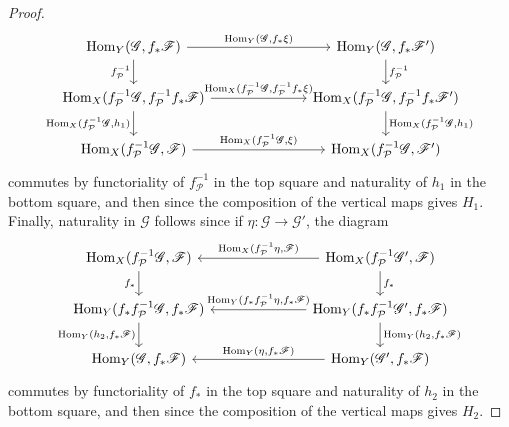\documentclass[10pt]{article}
\theoremstyle{definition}
\theoremstyle{remark}
\numberwithin{equation}{section}
\numberwithin{figure}{subsubsection}
\DeclareMathOperator{\Hom}{Hom}
\begin{document}
\begin{proof}
\begin{equation*}
\begin{tikzcd}[column sep=16ex]
      \Hom_Y(\mathscr{G},f_*\mathscr{F}) \rar{\Hom_Y(\mathscr{G},f_*\xi)}\dar[swap]{f_\mathcal{P}^{-1}} & \Hom_Y(\mathscr{G},f_*\mathscr{F}')\dar{f_\mathcal{P}^{-1}}\\
      \Hom_X(f_\mathcal{P}^{-1}\mathscr{G},f_\mathcal{P}^{-1}f_*\mathscr{F}) \rar{\Hom_X(f_\mathcal{P}^{-1}\mathscr{G},f_\mathcal{P}^{-1}f_*\xi)} \dar[swap]{\Hom_X(f_\mathcal{P}^{-1}\mathscr{G},h_1)} & \Hom_X(f_\mathcal{P}^{-1}\mathscr{G},f_\mathcal{P}^{-1}f_*\mathscr{F}')\dar{\Hom_X(f_\mathcal{P}^{-1}\mathscr{G},h_1)}\\
      \Hom_X(f_\mathcal{P}^{-1}\mathscr{G},\mathscr{F}) \rar{\Hom_X(f_\mathcal{P}^{-1}\mathscr{G},\xi)} & \Hom_X(f_\mathcal{P}^{-1}\mathscr{G},\mathscr{F}')
    \end{tikzcd}
  \end{equation*}
  commutes by functoriality of $f_\mathcal{P}^{-1}$ in the top square and naturality of $h_1$ in the bottom square, and then since the composition of the vertical maps gives $H_1$. Finally, naturality in $\mathscr{G}$ follows since if $\eta\colon\mathscr{G} \to \mathscr{G}'$, the diagram
  \begin{equation*}
    \begin{tikzcd}[column sep=16ex]
      \Hom_X(f^{-1}_\mathcal{P}\mathscr{G},\mathscr{F})\dar[swap]{f_*} & \Hom_X(f^{-1}_\mathcal{P}\mathscr{G}',\mathscr{F}) \arrow{l}[swap]{\Hom_X(f_\mathcal{P}^{-1}\eta,\mathscr{F})}\dar{f_*}\\
      \Hom_Y(f_*f^{-1}_\mathcal{P}\mathscr{G},f_*\mathscr{F})\dar[swap]{\Hom_Y(h_2,f_*\mathscr{F})} & \Hom_Y(f_*f^{-1}_\mathcal{P}\mathscr{G}',f_*\mathscr{F}) \arrow{l}[swap]{\Hom_Y(f_*f_\mathcal{P}^{-1}\eta,f_*\mathscr{F})}\dar{\Hom_Y(h_2,f_*\mathscr{F})}\\
      \Hom_Y(\mathscr{G},f_*\mathscr{F}) & \Hom_Y(\mathscr{G}',f_*\mathscr{F}) \arrow{l}[swap]{\Hom_Y(\eta,f_*\mathscr{F})}
    \end{tikzcd}
  \end{equation*}
  commutes by functoriality of $f_*$ in the top square and naturality of $h_2$ in the bottom square, and then since the composition of the vertical maps gives $H_2$.
\end{proof}
\end{document}
